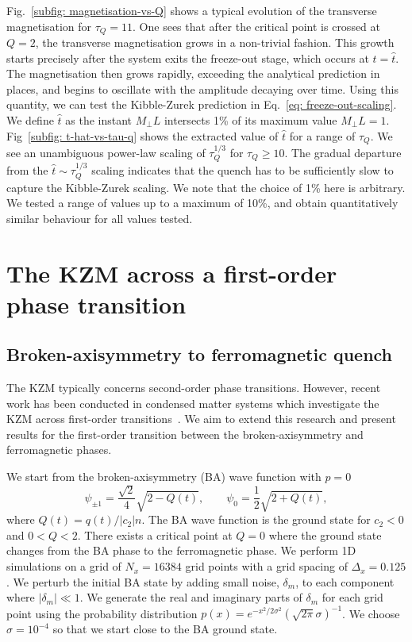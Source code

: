 Fig.~\ref{subfig: magnetisation-vs-Q} shows a typical evolution of the
transverse magnetisation for \(\tau_Q = 11\).
One sees that after the critical point is crossed at \( Q = 2 \), the transverse
magnetisation grows in a non-trivial fashion.
This growth starts precisely after the system exits the freeze-out stage, which
occurs at \(t=\hat{t}\).
The magnetisation then grows rapidly, exceeding the analytical prediction in
places, and begins to oscillate with the amplitude decaying over time.
Using this quantity, we can test the Kibble-Zurek prediction in
Eq.~\eqref{eq: freeze-out-scaling}.
We define \( \hat{t} \) as the instant \(M_\perp L\) intersects 1\% of its
maximum value \(M_\perp L = 1\).
Fig~\ref{subfig: t-hat-vs-tau-q} shows the extracted value of \( \hat{t} \) for
a range of \( \tau_Q \).
We see an unambiguous power-law scaling of \(\tau_Q^{1/3}\) for
\(\tau_Q \geq 10\).
The gradual departure from the \(\hat{t} \sim \tau_Q^{1/3}\) scaling indicates
that the quench has to be sufficiently slow to capture the Kibble-Zurek scaling.
We note that the choice of 1\% here is arbitrary.
We tested a range of values up to a maximum of 10\%, and obtain quantitatively
similar behaviour for all values tested.

\section{The KZM across a first-order phase transition}
\subsection{Broken-axisymmetry to ferromagnetic quench}
The KZM typically concerns second-order phase transitions. However, recent
work has been conducted in condensed matter systems which investigate
the KZM across first-order transitions~\cite{Qiu2020}.
We aim to extend this research and present results for
the first-order transition between the broken-axisymmetry and
ferromagnetic phases.

We start from the broken-axisymmetry (BA) wave function with \( p=0 \)
\begin{equation}
    \psi_{\pm 1} = \frac{\sqrt{2}}{4}\sqrt{2 - Q(t)}, \qquad
    \psi_0 = \frac{1}{2}\sqrt{2 + Q(t)},
    \label{eq: BA-initial-wavefunction}
\end{equation}
where \(Q(t)=q(t)/|c_2|n\).
The BA wave function is the ground state for \(c_2 < 0\) and \(0 < Q < 2\).
There exists a critical point at \( Q = 0 \) where the ground state changes from
the BA phase to the ferromagnetic phase.
We perform 1D simulations on a grid of \(N_x = 16384\) grid points with a grid
spacing of \(\Delta_x = 0.125\).
We perturb the initial BA state by adding small noise, \(\delta_m\), to each
component where \(|\delta_m| \ll 1\).
We generate the real and imaginary parts of \(\delta_m\) for each grid point
using the probability distribution
\(p(x) = e^{-x^2/2\sigma^2}{(\sqrt{2\pi}\sigma)}^{-1}\).
We choose \(\sigma=10^{-4}\) so that we start close to the BA ground state.

